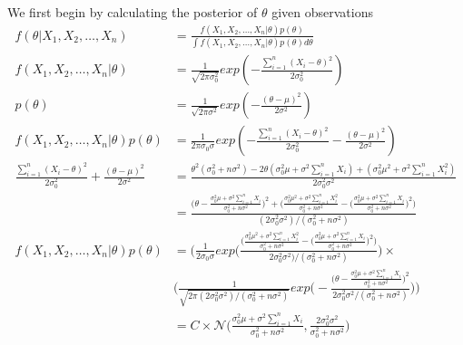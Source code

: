 \documentclass[../../probability-notes.tex]{subfiles}
\begin{document}
    We first begin by calculating the posterior of $\theta$ given observations
    \begin{align*}
        f(\theta|X_{1}, X_{2}, \ldots, X_{n}) &= \frac{f(X_{1}, X_{2}, \ldots, X_{n}|\theta)p(\theta)}{\int f(X_{1}, X_{2}, \ldots, X_{n}|\theta)p(\theta) d\theta}\\
        f(X_{1}, X_{2}, \ldots, X_{n}|\theta) &= \frac{1}{\sqrt{2 \pi \sigma_{0}^{2}}} exp(-\frac{\sum_{i=1}^{n} (X_{i} - \theta)^{2}}{2\sigma_{0}^{2}})\\
        p(\theta) &= \frac{1}{\sqrt{2 \pi \sigma^{2}}} exp(-\frac{(\theta - \mu)^{2}}{2\sigma^{2}})\\
        f(X_{1}, X_{2}, \ldots, X_{n}|\theta)p(\theta) &= \frac{1}{2 \pi \sigma_{0} \sigma} exp(-\frac{\sum_{i=1}^{n} (X_{i} - \theta)^{2}}{2\sigma_{0}^{2}} -\frac{(\theta - \mu)^{2}}{2\sigma^{2}})\\
        \frac{\sum_{i=1}^{n} (X_{i} - \theta)^{2}}{2\sigma_{0}^{2}} +\frac{(\theta - \mu)^{2}}{2\sigma^{2}} &= \frac{\theta^{2}(\sigma_{0}^{2} + n\sigma^{2}) - 2\theta(\sigma_{0}^{2} \mu + \sigma^{2} \sum_{i=1}^{n} X_{i}) + (\sigma_{0}^{2} \mu^{2} + \sigma^{2} \sum_{i=1}^{n}X_{i}^{2})}{2\sigma_{0}^{2}\sigma^{2}}\\
        &= \frac{\big(\theta - \frac{\sigma_{0}^{2} \mu + \sigma^{2}\sum_{i=1}^{n} X_{i}}{\sigma_{0}^{2} + n\sigma^{2}}\big)^{2} + \big(\frac{\sigma_{0}^{2} \mu^{2} + \sigma^{2} \sum_{i=1}^{n}X_{i}^{2}}{\sigma_{0}^{2} + n\sigma^{2}} - \big(\frac{\sigma_{0}^{2} \mu + \sigma^{2}\sum_{i=1}^{n} X_{i}}{\sigma_{0}^{2} + n\sigma^{2}}\big)^{2}\big)}{(2\sigma_{0}^{2} \sigma^{2})/(\sigma_{0}^{2} + n\sigma^{2})}\\
        f(X_{1}, X_{2}, \ldots, X_{n}|\theta)p(\theta) &= \bigg(\frac{1}{2\sigma_{0}\sigma}exp\bigg(\frac{\big(\frac{\sigma_{0}^{2} \mu^{2} + \sigma^{2} \sum_{i=1}^{n}X_{i}^{2}}{\sigma_{0}^{2} + n\sigma^{2}} - \big(\frac{\sigma_{0}^{2} \mu + \sigma^{2}\sum_{i=1}^{n} X_{i}}{\sigma_{0}^{2} + n\sigma^{2}}\big)^{2}\big)}{2\sigma_{0}^{2} \sigma^{2})/(\sigma_{0}^{2} + n\sigma^{2})}\bigg)\times\\
        &\bigg(\frac{1}{\sqrt{2\pi(2\sigma_{0}^{2} \sigma^{2})/(\sigma_{0}^{2} + n\sigma^{2})}}exp\bigg(-\frac{\big(\theta - \frac{\sigma_{0}^{2} \mu + \sigma^{2}\sum_{i=1}^{n} X_{i}}{\sigma_{0}^{2} + n\sigma^{2}}\big)^{2}}{2\sigma_{0}^{2} \sigma^{2}/(\sigma_{0}^{2} + n\sigma^{2})}\bigg)\bigg)\\
        &= C \times \mathcal{N}\bigg(\frac{\sigma_{0}^{2} \mu + \sigma^{2}\sum_{i=1}^{n} X_{i}}{\sigma_{0}^{2} + n\sigma^{2}}, \frac{2\sigma_{0}^{2} \sigma^{2}}{\sigma_{0}^{2} + n\sigma^{2}}\bigg)\\

\end{align*}
\end{document}
